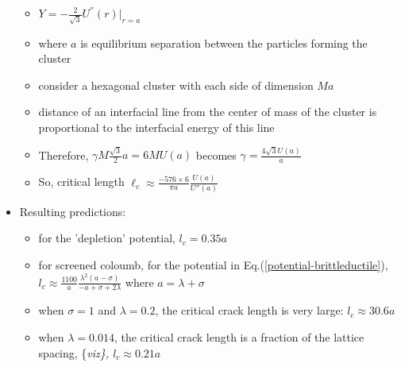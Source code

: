 \documentclass{umthesis}          %
\begin{document}
\begin{itemize}
\begin{itemize}
\item $Y = - \frac{2}{\sqrt{3}} U^{''}(r)|_{r=a}$\\
\label{sec-3.1.5.7.1}


\item where $a$ is equilibrium separation between the particles forming the cluster\\
\label{sec-3.1.5.7.2}


\item consider a hexagonal cluster with each side of dimension $M a$\\
\label{sec-3.1.5.7.3}


\item distance of an interfacial line from the center of mass of the cluster is proportional to the interfacial energy of this line\\
\label{sec-3.1.5.7.4}


\item Therefore, $\gamma M  \frac{\sqrt{3}}{2} a  =  6 M U(a)$ becomes  $\gamma  = \frac{4\sqrt{3} U(a)}{a}$\\
\label{sec-3.1.5.7.5}


\item So, critical length  $\ell_c \approx  \frac{- 576 \times 6}{\pi a} \frac{U(a)}{U''(a)}$\\
\label{sec-3.1.5.7.6}

\end{itemize} %

\item Resulting predictions:\\
\label{sec-3.1.5.8}

\begin{itemize}

\item for the 'depletion' potential, $l_c=0.35 a$\\
\label{sec-3.1.5.8.1}


\item for screened coloumb, for the potential in Eq.(\ref{potential-brittleductile}), $l_c \approx \frac{1100}{a} \frac{\lambda^2 (a-\sigma)}{-a+\sigma+2\lambda}$ where $a=\lambda+\sigma$\\
\label{sec-3.1.5.8.2}


\item when  $\sigma=1$ and $\lambda=0.2$,  the critical crack length  is very large: $l_c \approx 30.6 a$\\
\label{sec-3.1.5.8.3}


\item when $\lambda=0.014$, the critical crack length is a fraction of the lattice spacing, \{\it viz\}, $l_c \approx 0.21a$\\
\label{sec-3.1.5.8.4}



\end{itemize}
\end{itemize}
\end{document}
